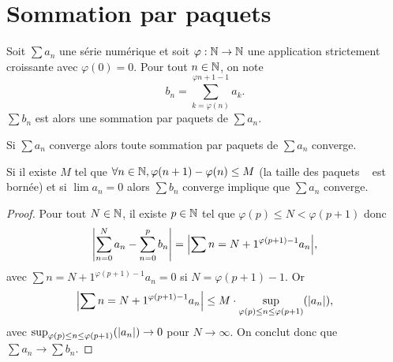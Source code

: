 \documentclass[french]{article}
\begin{document}
\section{Sommation par paquets}

\begin{defn}
Soit $\sum a_n$ une série numérique et soit $\varphi : \N \to \N$ une application strictement croissante avec $\varphi(0)=0$.
Pour tout $n \in \N$, on note 
\[ b_n = \sum_{k=\varphi(n)}^{\varphi{n+1}-1} a_k . \]
 $\sum b_n$ est alors une sommation par paquets de $\sum a_n$.
\end{defn}

\begin{lem}
Si $\sum a_n$ converge alors toute sommation par paquets de $\sum a_n$ converge.
\end{lem}

\begin{thm}
Si il existe $M$ tel que $\forall n \in \N, \varphi(n+1) - \varphi(n) \leq M$ (la \og taille des paquets \fg~ est bornée) et si 
$\lim a_n = 0$ alors $\sum b_n$ converge implique que $\sum a_n$ converge.
\end{thm}

\begin{proof}
Pour tout $N \in \N$, il existe $p \in \N$ tel que $\varphi(p) \leq N < \varphi(p+1)$ donc 
\[ \abs*{\sum_{n=0}^N a_n - \sum_{n=0}^p b_n} = \abs*{\sum{n=N+1}^{\varphi(p+1)-1} a_n}, \]
avec $\sum{n=N+1}^{\varphi(p+1)-1} a_n = 0$ si $N = \varphi(p+1)-1$. Or
\[ \abs*{\sum{n=N+1}^{\varphi(p+1)-1} a_n} \leq M \cdot \sup_{\varphi(p) \leq n \leq \varphi(p+1)} (\abs{a_n}) , \]
avec $\sup_{\varphi(p) \leq n \leq \varphi(p+1)} (\abs{a_n}) \to 0$ pour $N \to \infty$.
On conclut donc que $\sum a_n \to \sum b_n$.
\end{proof}
\end{document}
